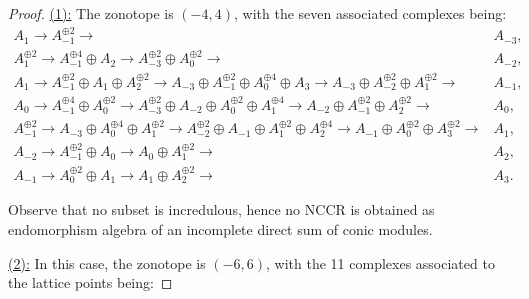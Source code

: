 \documentclass[10pt,a4paper]{amsart}
\begin{document}
\begin{proof}
    \underline{(1):} The zonotope is $(-4,4)$, with the seven associated complexes being:
    \begin{align*}
        A_1\longrightarrow A_{-1}^{\oplus 2}\longrightarrow & A_{-3},\\
        A_1^{\oplus 2}\longrightarrow A_{-1}^{\oplus 4}\oplus A_2\longrightarrow A_{-3}^{\oplus 2}\oplus A_0^{\oplus 2}\longrightarrow & A_{-2},\\
        A_1 \longrightarrow A_{-1}^{\oplus 2}\oplus A_1\oplus A_2^{\oplus 2}\longrightarrow A_{-3}\oplus A_{-1}^{\oplus 2}\oplus A_0^{\oplus 4}\oplus A_3\longrightarrow A_{-3}\oplus A_{-2}^{\oplus 2}\oplus A_1^{\oplus 2}\longrightarrow & A_{-1},\\
        A_0\longrightarrow A_{-1}^{\oplus 4}\oplus A_0^{\oplus 2}\longrightarrow A_{-3}^{\oplus 2}\oplus A_{-2}\oplus A_0^{\oplus 2}\oplus A_1^{\oplus 4}\longrightarrow A_{-2}\oplus A_{-1}^{\oplus 2}\oplus A_{2}^{\oplus 2}\longrightarrow & A_0,\\
        A_{-1}^{\oplus 2}\longrightarrow A_{-3}\oplus A_0^{\oplus 4}\oplus A_1^{\oplus 2}\longrightarrow A_{-2}^{\oplus 2}\oplus A_{-1}\oplus A_1^{\oplus 2}\oplus A_2^{\oplus 4}\longrightarrow A_{-1}\oplus A_0^{\oplus 2}\oplus A_3^{\oplus 2}\longrightarrow & A_1,\\
        A_{-2}\longrightarrow A_{-1}^{\oplus 2}\oplus A_0\longrightarrow A_0\oplus A_1^{\oplus 2}\longrightarrow & A_2,\\
        A_{-1}\longrightarrow A_0^{\oplus 2}\oplus A_1\longrightarrow A_1\oplus A_2^{\oplus 2}\longrightarrow &  A_3.
    \end{align*}


    Observe that no subset is incredulous, hence no NCCR is obtained as endomorphism algebra of an incomplete direct sum of conic modules. 

    \underline{(2):} In this case, the zonotope is $(-6,6)$, with the 11 complexes associated to the lattice points being:


\end{proof}
\end{document}
